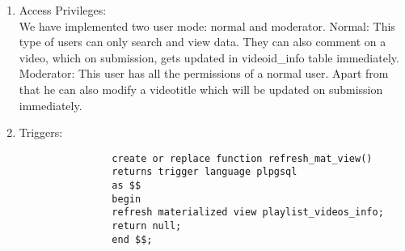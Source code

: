 \documentclass[10pt]{article}
\begin{document}
\begin{enumerate}
\begin{enumerate}
			\item Access Privileges:\\
				We have implemented two user mode: normal and moderator.
				Normal: This type of users can only search and view data. They can also comment on a video, which on submission, gets updated in videoid\_info table immediately.\\
				Moderator: This user has all the permissions of a normal user. Apart from that he can also modify a videotitle which will be updated on submission immediately.
			\item Triggers:
				\begin{lstlisting}
				create or replace function refresh_mat_view()
				returns trigger language plpgsql
				as $$
				begin
				refresh materialized view playlist_videos_info;
				return null;
				end $$;
				

\end{lstlisting}
\end{enumerate}
\end{enumerate}
\end{document}
